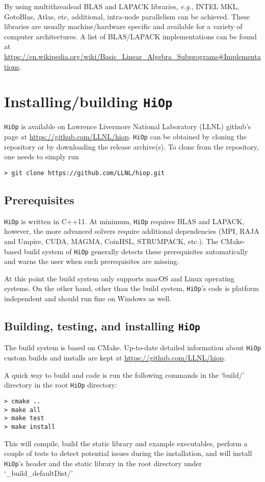 \documentclass[11pt]{article}
\newcommand{\Hi}{\texttt{HiOp}\xspace}
\begin{document}
By using multithreadead BLAS and LAPACK libraries, \textit{e.g.}, INTEL MKL, GotoBlas, Atlas, etc, additional,  intra-node parallelism can be achieved. These libraries are usually  machine/hardware specific and available for a variety of computer architectures. A list of BLAS/LAPACK implementations can be found at 
\url{https://en.wikipedia.org/wiki/Basic_Linear_Algebra_Subprograms\#Implementations}. 

\section{Installing/building \Hi}
\Hi is available on  Lawrence Livermore National Laboratory (LLNL)  github's page at 
\url{https://github.com/LLNL/hiop}. \Hi can be obtained by cloning the repository or by downloading the release archive(s). To clone from the repository, one needs to simply run
\begin{verbatim}
> git clone https://github.com/LLNL/hiop.git
\end{verbatim}

\subsection{Prerequisites} 
\Hi is written in C++11. At minimum, \Hi  requires BLAS and LAPACK, however, the more advanced solvers require additional dependencies (MPI, RAJA and Umpire, CUDA, MAGMA, CoinHSL, STRUMPACK, etc.). The CMake-based build system of \Hi generally detects these prerequisites automatically and warns the user when such prerequisites are missing.

At this point the build system only supports macOS and Linux operating systems. On the other hand, other than the build system, \Hi's code is  platform independent and should run fine on Windows as well.


\subsection{Building, testing, and installing \Hi}
The build system is based on CMake. Up-to-date detailed information about \Hi custom builds and installs are kept at \url{https://github.com/LLNL/hiop}. 

A quick way to build and code is run the following commands in the `build\//' directory in the root \Hi directory: 
\begin{verbatim}
> cmake ..
> make all
> make test
> make install
\end{verbatim}
This will compile, build the static library and example executables, perform a couple of tests to detect potential issues during the installation, and will install \Hi's header and the static library in the root directory under `\_build\_defaultDist\//'
\end{document}
